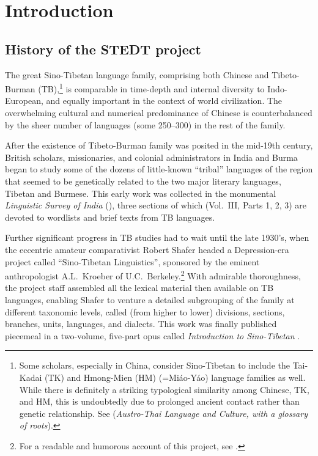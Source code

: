 \vspace{0.25em}


\renewcommand{\thefootnote}{\arabic{footnote}}
\setcounter{footnote}{0}

\chapter*{Introduction}

\section{History of the STEDT project}

The great Sino-Tibetan language family, comprising both Chinese and Tibeto-Burman (TB),\footnote{Some scholars, especially in China, consider Sino-Tibetan to include the Tai-Kadai (TK) and Hmong-Mien (HM) (=Mi\'ao-Y\'ao) language families as well.  While there is definitely a striking typological similarity among Chinese, TK, and HM, this is undoubtedly due to prolonged ancient contact rather than genetic relationship.  See \citealt{PKB-ATLC} (\textit{Austro-Thai Language and Culture, with a glossary of roots}).} is comparable in time-depth and internal diversity to Indo-European, and equally important in the context of world civilization. The overwhelming cultural and numerical predominance of Chinese is counterbalanced by the sheer number of languages (some 250–300) in the rest of the family.

After the existence of Tibeto-Burman family was posited in the mid-19th century, British scholars, missionaries, and colonial administrators in India and Burma began to study some of the dozens of little-known “tribal” languages of the region that seemed to be genetically related to the two major literary languages, Tibetan and Burmese. This early work was collected in the monumental \textit{Linguistic Survey of India} (\citealt{LSI}), three sections of which (Vol.~III, Parts 1, 2, 3) are devoted to wordlists and brief texts from TB languages.

Further significant progress in TB studies had to wait until the late 1930’s, when the eccentric amateur comparativist Robert Shafer headed a Depression-era project called “Sino-Tibetan Linguistics”, sponsored by the eminent anthropologist A.L.\ Kroeber of U.C.\ Berkeley.\footnote{For a readable and humorous account of this project, see \citealt{PKB-WIAB}.} With admirable thoroughness, the project staff assembled all the lexical material then available on TB languages, enabling Shafer to venture a detailed subgrouping of the family at different taxonomic levels, called (from higher to lower) divisions, sections, branches, units, languages, and dialects. This work was finally published piecemeal in a two-volume, five-part opus called \textit{Introduction to Sino-Tibetan} \citeyearpar{SHA1966-73}.

